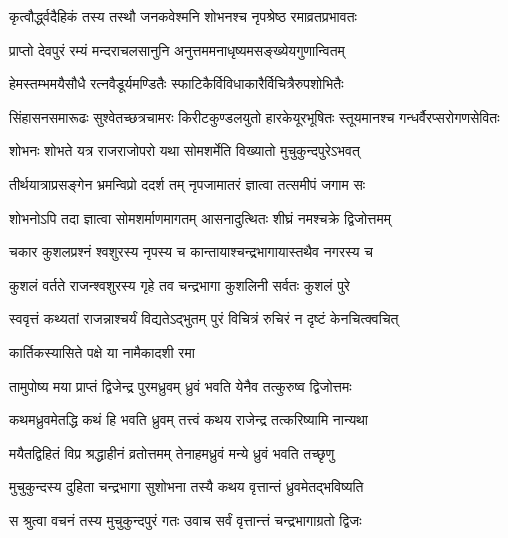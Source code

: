 \twolineshloka
{कृत्वौर्द्ध्वदैहिकं तस्य तस्थौ जनकवेश्मनि}
{शोभनश्च नृपश्रेष्ठ रमाव्रतप्रभावतः}%

\twolineshloka
{प्राप्तो देवपुरं रम्यं मन्दराचलसानुनि}
{अनुत्तममनाधृष्यमसङ्ख्येयगुणान्वितम्}%

\twolineshloka
{हेमस्तम्भमयैसौधै रत्नवैडूर्यमण्डितैः}
{स्फाटिकैर्विविधाकारैर्विचित्रैरुपशोभितैः}%

\threelineshloka
{सिंहासनसमारूढः सुश्वेतच्छत्रचामरः}
{किरीटकुण्डलयुतो हारकेयूरभूषितः}
{स्तूयमानश्च गन्धर्वैरप्सरोगणसेवितः }%

\twolineshloka
{शोभनः शोभते यत्र राजराजोपरो यथा}
{सोमशर्मेति विख्यातो मुचुकुन्दपुरेऽभवत्}%

\twolineshloka
{तीर्थयात्राप्रसङ्गेन भ्रमन्विप्रो ददर्श तम्}
{नृपजामातरं ज्ञात्वा तत्समीपं जगाम सः}%

\twolineshloka
{शोभनोऽपि तदा ज्ञात्वा सोमशर्माणमागतम्}
{आसनादुत्थितः शीघ्रं नमश्चक्रे द्विजोत्तमम्}%

\twolineshloka
{चकार कुशलप्रश्नं श्वशुरस्य नृपस्य च}
{कान्तायाश्चन्द्रभागायास्तथैव नगरस्य च}%


\twolineshloka
{कुशलं वर्तते राजन्श्वशुरस्य गृहे तव}
{चन्द्रभागा कुशलिनी सर्वतः कुशलं पुरे}%

\twolineshloka
{स्ववृत्तं कथ्यतां राजन्नाश्चर्यं विद्यतेऽद्भुतम्}
{पुरं विचित्रं रुचिरं न दृष्टं केनचित्क्वचित्}%

\onelineshloka
{कार्तिकस्यासिते पक्षे या नामैकादशी रमा}%

\twolineshloka
{तामुपोष्य मया प्राप्तं द्विजेन्द्र पुरमध्रुवम्}
{ध्रुवं भवति येनैव तत्कुरुष्व द्विजोत्तमः}%


\twolineshloka
{कथमध्रुवमेतद्धि कथं हि भवति ध्रुवम्}
{तत्त्वं कथय राजेन्द्र तत्करिष्यामि नान्यथा}%


\twolineshloka
{मयैतद्विहितं विप्र श्रद्धाहीनं व्रतोत्तमम्}
{तेनाहमध्रुवं मन्ये ध्रुवं भवति तच्छृणु}%

\twolineshloka
{मुचुकुन्दस्य दुहिता चन्द्रभागा सुशोभना}
{तस्यै कथय वृत्तान्तं ध्रुवमेतद्भविष्यति}%


\twolineshloka
{स श्रुत्वा वचनं तस्य मुचुकुन्दपुरं गतः}
{उवाच सर्वं वृत्तान्त्तं चन्द्रभागाग्रतो द्विजः}%

